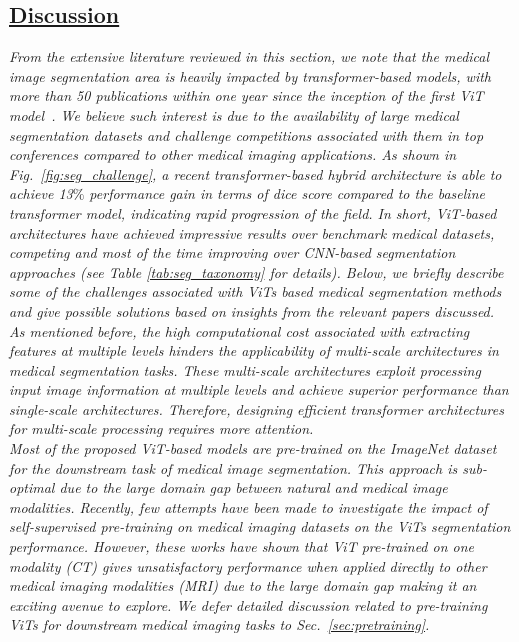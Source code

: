 \documentclass[10pt,journal,compsoc]{IEEEtran}
\begin{document}
\begin{tcolorbox}[top=0.5pt,left=0pt,size=minimal,boxrule = 0pt,breakable, enhanced]%
\subsection{\textbf{\underline{Discussion}}}
\hspace{0.75em}\textit{From the extensive literature reviewed in this section, we note that the medical image segmentation area is heavily impacted by transformer-based models, with more than 50 publications within one year since the inception of the first ViT model~\cite{dosovitskiy2020image}. We believe such interest is due to the availability of large medical segmentation datasets and challenge competitions associated with them in top conferences compared to other medical imaging applications. As shown in Fig.~\ref{fig:seg_challenge}, a recent transformer-based hybrid architecture is able to achieve 13$\%$ performance gain in terms of dice score compared to the baseline transformer model, indicating rapid progression of the field. In short, ViT-based architectures have achieved impressive results over benchmark medical datasets, competing and most of the time improving over CNN-based segmentation approaches (see Table \ref{tab:seg_taxonomy} for details). Below, we briefly describe some of the challenges associated with ViTs based medical segmentation methods and give possible solutions based on insights from the relevant papers discussed.}
\\
\vspace{0.01em}
\textit{As mentioned before, the high computational cost associated with extracting features at multiple levels hinders the applicability of multi-scale architectures in medical segmentation tasks. These multi-scale architectures exploit processing input image information at multiple levels and achieve superior performance than single-scale architectures. Therefore, designing efficient transformer architectures for multi-scale processing requires more attention.
}
\\
\vspace{0.01em}
\textit{ Most of the proposed ViT-based models are pre-trained on the ImageNet dataset for the downstream task of medical image segmentation. This approach is sub-optimal due to the large domain gap between natural and medical image modalities. Recently, few attempts have been made to investigate the impact of self-supervised pre-training on medical imaging datasets on the ViTs segmentation performance. However, these works have shown that ViT pre-trained on one modality (CT) gives unsatisfactory performance when applied directly to other medical imaging modalities (MRI) due to the large domain gap making it an exciting avenue to explore. We defer detailed discussion related to pre-training ViTs for downstream medical imaging tasks to Sec.~\ref{sec:pretraining}.
}
\end{tcolorbox}
\end{document}
